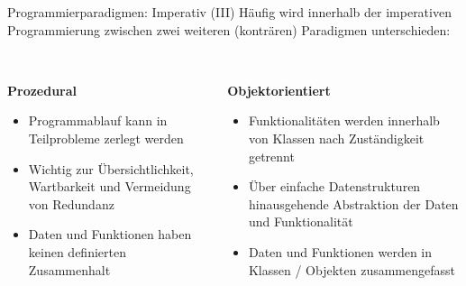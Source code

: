             \begin{frame}{Programmierparadigmen: Imperativ (III)}
                Häufig wird innerhalb der imperativen Programmierung zwischen zwei weiteren (konträren) Paradigmen unterschieden: \\~\ 
                
                \begin{columns}[T]
                    \begin{column}{0.5\textwidth}
                        \textbf{Prozedural}
                        \begin{itemize}
                            \item Programmablauf kann in Teilprobleme zerlegt werden
                            \item Wichtig zur Übersichtlichkeit, Wartbarkeit und Vermeidung von Redundanz
                            \item Daten und Funktionen haben keinen definierten Zusammenhalt
                        \end{itemize}
                    \end{column}
                    
                    \begin{column}{0.5\textwidth}
                        \textbf{Objektorientiert}      
                        \begin{itemize}
                            \item Funktionalitäten werden innerhalb von Klassen nach Zuständigkeit getrennt
                            \item Über einfache Datenstrukturen hinausgehende Abstraktion der Daten und Funktionalität 
                            \item Daten und Funktionen werden in Klassen / Objekten zusammengefasst
                        \end{itemize}
                    \end{column}
                \end{columns}
                
            \end{frame}
            
